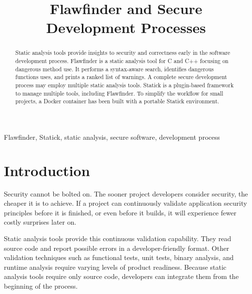 \documentclass[journal]{IEEEtran}
\begin{document}

\title{Flawfinder and Secure Development Processes}

\author{
}

\maketitle



\begin{abstract}
Static analysis tools provide insights to security and correctness early in the software development
process. Flawfinder is a static analysis tool for C and C++ focusing on dangerous method use. It
performs a syntax-aware search, identifies dangerous functions uses, and prints a ranked list of
warnings. A complete secure development process may employ multiple static analysis tools. Statick
is a plugin-based framework to manage multiple tools, including Flawfinder. To simplify the workflow
for small projects, a Docker container has been built with a portable Statick environment.
\end{abstract}

\begin{IEEEkeywords}
Flawfinder, Statick, static analysis, secure software, development process
\end{IEEEkeywords}



\section{Introduction}

Security cannot be bolted on. The sooner project developers consider security, the cheaper it is to
achieve. If a project can continuously validate application security principles before it is
finished, or even before it builds, it will experience fewer costly surprises later on.

Static analysis tools provide this continuous validation capability. They read source code and
report possible errors in a developer-friendly format. Other validation techniques such as
functional tests, unit tests, binary analysis, and runtime analysis require varying levels of
product readiness. Because static analysis tools require only source code, developers can integrate
them from the beginning of the process.
\end{document}
